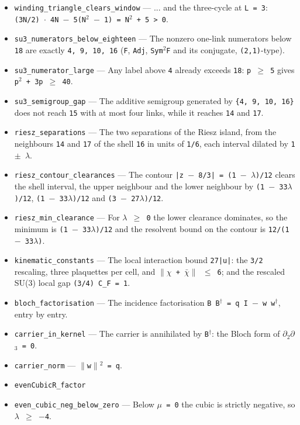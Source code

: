 \documentclass[11pt]{article}
\theoremstyle{plain}
\theoremstyle{definition}
\theoremstyle{remark}
\begin{document}
\begin{itemize}
\item \texttt{winding\_triangle\_clears\_window} --- ... and the three-cycle at \texttt{L = 3}: \texttt{(3N/2) $\cdot$ 4N $-$ 5(N$^2$ $-$ 1) = N$^2$ + 5 > 0}.
\item \texttt{su3\_numerators\_below\_eighteen} --- The nonzero one-link numerators below \texttt{18} are exactly \texttt{4, 9, 10, 16} (\texttt{F}, \texttt{Adj}, \texttt{Sym$^2$F} and its conjugate, \texttt{(2,1)}-type).
\item \texttt{su3\_numerator\_large} --- Any label above \texttt{4} already exceeds \texttt{18}: \texttt{p $\ge$ 5} gives \texttt{p$^2$ + 3p $\ge$ 40}.
\item \texttt{su3\_semigroup\_gap} --- The additive semigroup generated by \texttt{\{4, 9, 10, 16\}} does not reach \texttt{15} with at most four links, while it reaches \texttt{14} and \texttt{17}.
\item \texttt{riesz\_separations} --- The two separations of the Riesz island, from the neighbours \texttt{14} and \texttt{17} of the shell \texttt{16} in units of \texttt{1/6}, each interval dilated by \texttt{1 $\pm$ $\lambda$}.
\item \texttt{riesz\_contour\_clearances} --- The contour \texttt{|z $-$ 8/3| = (1 $-$ $\lambda$)/12} clears the shell interval, the upper neighbour and the lower neighbour by \texttt{(1 $-$ 33$\lambda$)/12}, \texttt{(1 $-$ 33$\lambda$)/12} and \texttt{(3 $-$ 27$\lambda$)/12}.
\item \texttt{riesz\_min\_clearance} --- For \texttt{$\lambda$ $\ge$ 0} the lower clearance dominates, so the minimum is \texttt{(1 $-$ 33$\lambda$)/12} and the resolvent bound on the contour is \texttt{12/(1 $-$ 33$\lambda$)}.
\item \texttt{kinematic\_constants} --- The local interaction bound \texttt{27|u|}: the \texttt{3/2} rescaling, three plaquettes per cell, and \texttt{$\|$$\chi$ + $\bar\chi$$\|$ $\le$ 6}; and the rescaled SU(3) local gap \texttt{(3/4) C\_F = 1}.
\item \texttt{bloch\_factorisation} --- The incidence factorisation \texttt{B B$^\dagger$ = q I $-$ w w$^\dagger$}, entry by entry.
\item \texttt{carrier\_in\_kernel} --- The carrier is annihilated by \texttt{B$^\dagger$}: the Bloch form of \texttt{$\partial$$_2$$\partial$$_3$ = 0}.
\item \texttt{carrier\_norm} --- \texttt{$\|$w$\|$$^2$ = q}.
\item \texttt{evenCubicR\_factor}
\item \texttt{even\_cubic\_neg\_below\_zero} --- Below \texttt{$\mu$ = 0} the cubic is strictly negative, so \texttt{$\lambda$ $\ge$ $-$4}.

\end{itemize}
\end{document}
